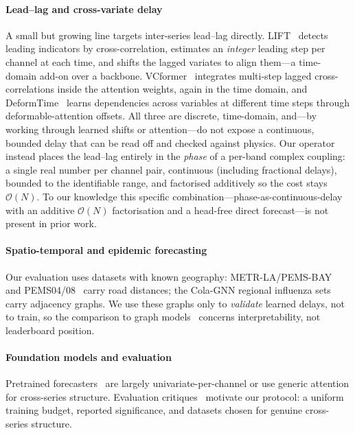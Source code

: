 \documentclass[journal,a4paper]{IEEEtran}
\begin{document}
\paragraph{Lead--lag and cross-variate delay} A small but growing line targets inter-series
lead--lag directly. LIFT~\citep{zhao2024lift} detects leading indicators by cross-correlation,
estimates an \emph{integer} leading step per channel at each time, and shifts the lagged variates
to align them---a time-domain add-on over a backbone. VCformer~\citep{yang2024vcformer} integrates
multi-step lagged cross-correlations inside the attention weights, again in the time domain, and
DeformTime~\citep{shu2025deformtime} learns dependencies across variables at different time steps
through deformable-attention offsets. All three are discrete, time-domain, and---by working through
learned shifts or attention---do not expose a continuous, bounded delay that can be read off and
checked against physics. Our operator instead places the lead--lag entirely in the \emph{phase} of
a per-band complex coupling: a single real number per channel pair, continuous (including
fractional delays), bounded to the identifiable range, and factorised additively so the cost stays
$\mathcal{O}(N)$. To our knowledge this specific combination---phase-as-continuous-delay with an
additive $\mathcal{O}(N)$ factorisation and a head-free direct forecast---is not present in prior
work.

\paragraph{Spatio-temporal and epidemic forecasting} Our evaluation uses datasets with known
geography: METR-LA/PEMS-BAY~\citep{li2018dcrnn} and PEMS04/08~\citep{guo2019astgcn} carry road
distances; the Cola-GNN regional influenza sets~\citep{deng2020colagnn} carry adjacency graphs. We
use these graphs only to \emph{validate} learned delays, not to train, so the comparison to graph
models~\citep{wu2019graphwavenet2} concerns interpretability, not leaderboard position.

\paragraph{Foundation models and evaluation} Pretrained forecasters~\citep{das2024timesfm,
ansari2024chronos,woo2024moirai,liu2025timerxl} are largely univariate-per-channel or use generic
attention for cross-series structure. Evaluation critiques~\citep{brigato2025champions,
abdelmalak2025biased} motivate our protocol: a uniform training budget, reported significance, and
datasets chosen for genuine cross-series structure.
\end{document}

